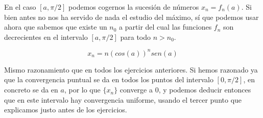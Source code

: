 En el caso $[a, \pi/2]$ podemos cogernos la sucesión de números $x_n = f_n(a)$. Si bien antes no nos ha servido de nada el estudio del máximo, sí que podemos usar ahora que sabemos que existe un $n_0$ a partir del cual las funciones $f_n$ son decrecientes en el intervalo $[a, \pi/2]$ para todo $n>n_0$.

$$x_n = n(cos(a))^nsen(a)$$

Mismo razonamiento que en todos los ejercicios anteriores. Si hemos razonado ya que la convergencia puntual se da en todos los puntos del intervalo $[0, \pi/2]$, en concreto se da en $a$, por lo que $\{x_n\}$ converge a 0, y podemos deducir entonces que en este intervalo hay convergencia uniforme, usando el tercer punto que explicamos justo antes de los ejercicios.

 
